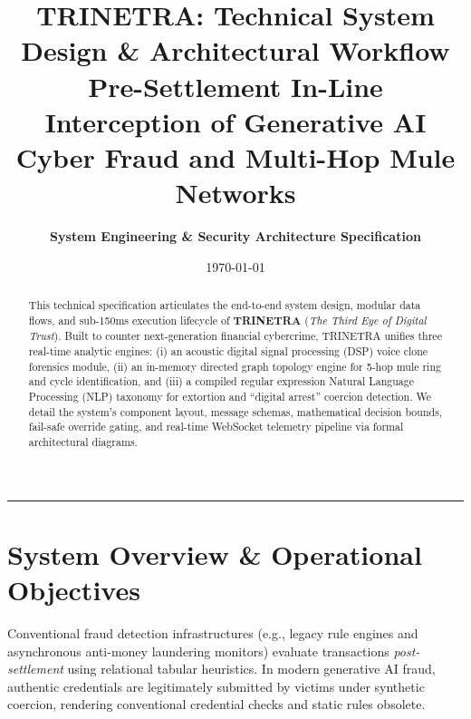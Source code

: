 \documentclass[11pt,a4paper]{article}
\title{
    \vspace{-1.5cm}
    \textbf{\LARGE TRINETRA: Technical System Design \& Architectural Workflow}\\[0.3em]
    \large Pre-Settlement In-Line Interception of Generative AI Cyber Fraud and Multi-Hop Mule Networks
}
\author{\textbf{System Engineering \& Security Architecture Specification}}
\date{\today}
\begin{document}
\maketitle

\begin{abstract}
This technical specification articulates the end-to-end system design, modular data flows, and sub-150ms execution lifecycle of \textbf{TRINETRA} (\textit{The Third Eye of Digital Trust}). Built to counter next-generation financial cybercrime, TRINETRA unifies three real-time analytic engines: (i) an acoustic digital signal processing (DSP) voice clone forensics module, (ii) an in-memory directed graph topology engine for 5-hop mule ring and cycle identification, and (iii) a compiled regular expression Natural Language Processing (NLP) taxonomy for extortion and ``digital arrest'' coercion detection. We detail the system's component layout, message schemas, mathematical decision bounds, fail-safe override gating, and real-time WebSocket telemetry pipeline via formal architectural diagrams.
\end{abstract}

\tableofcontents
\vspace{0.8em}
\hrule
\vspace{1em}

\section{System Overview \& Operational Objectives}
\label{sec:overview}

Conventional fraud detection infrastructures (e.g., legacy rule engines and asynchronous anti-money laundering monitors) evaluate transactions \textit{post-settlement} using relational tabular heuristics. In modern generative AI fraud, authentic credentials are legitimately submitted by victims under synthetic coercion, rendering conventional credential checks and static rules obsolete.
\end{document}
